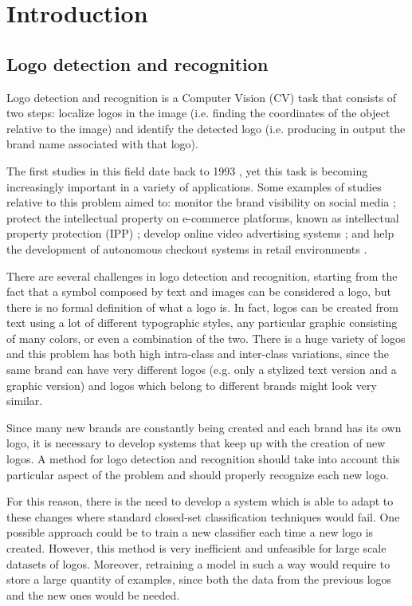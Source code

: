 \chapter{Introduction}
\label{chap:introduction}

\section{Logo detection and recognition}
\label{sec:logodet-intro}

Logo detection and recognition is a Computer Vision (CV) task that consists of two steps: localize logos in the image (i.e. finding the coordinates of the object relative to the image) and identify the detected logo (i.e. producing in output the brand name associated with that logo).

The first studies in this field date back to 1993 \cite{doermann1993logo}, yet this task is becoming increasingly important in a variety of applications. Some examples of studies relative to this problem aimed to: monitor the brand visibility on social media \cite{7492197}; protect the intellectual property on e-commerce platforms, known as intellectual property protection (IPP) \cite{jin2020open}; develop online video advertising systems \cite{cheng2017video}; and help the development of autonomous checkout systems in retail environments \cite{mata2022standardsim}.

There are several challenges in logo detection and recognition, starting from the fact that a symbol composed by text and images can be considered a logo, but there is no formal definition of what a logo is. In fact, logos can be created from text using a lot of different typographic styles, any particular graphic consisting of many colors, or even a combination of the two.
There is a huge variety of logos and this problem has both high intra-class and inter-class variations, since the same brand can have very different logos (e.g. only a stylized text version and a graphic version) and logos which belong to different brands might look very similar.

Since many new brands are constantly being created and each brand has its own logo, it is necessary to develop systems that keep up with the creation of new logos. A method for logo detection and recognition should take into account this particular aspect of the problem and should properly recognize each new logo.

For this reason, there is the need to develop a system which is able to adapt to these changes where standard closed-set classification techniques would fail. One possible approach could be to train a new classifier each time a new logo is created. However, this method is very inefficient and unfeasible for large scale datasets of logos. Moreover, retraining a model in such a way would require to store a large quantity of examples, since both the data from the previous logos and the new ones would be needed.


